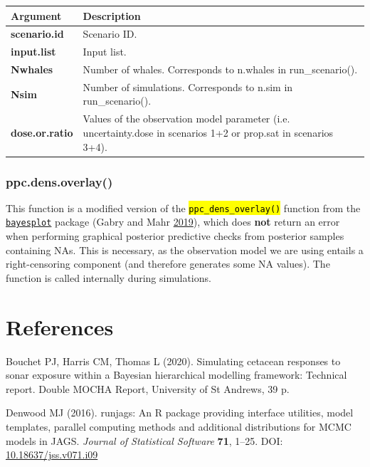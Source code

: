 \documentclass[
]{article}
\begin{document}
\renewcommand{\arraystretch}{1.4}
\begin{table}[H]
\centering
\begin{tabular}{>{\bfseries}l|>{\raggedright\arraybackslash}p{30em}}
\toprule
\textbf{Argument} & \textbf{Description}\\
\midrule
scenario.id & Scenario ID.\\
input.list & Input list.\\
Nwhales & Number of whales. Corresponds to n.whales in run\_scenario().\\
Nsim & Number of simulations. Corresponds to n.sim in run\_scenario().\\
dose.or.ratio & Values of the observation model parameter (i.e. uncertainty.dose in scenarios 1+2 or prop.sat in scenarios 3+4).\\
\bottomrule
\end{tabular}
\end{table}

\subsubsection{ppc.dens.overlay()}

This function is a modified version of the \textcolor{codecolor}{\texttt{\hl{ppc\_dens\_overlay()}}} function from the \href{https://cran.r-project.org/web/packages/bayesplot/index.html}{\texttt{bayesplot}} package (Gabry and Mahr \protect\hyperlink{ref-Gabry2019}{2019}), which does \textbf{not} return an error when performing graphical posterior predictive checks from posterior samples containing NAs. This is necessary, as the observation model we are using entails a right-censoring component (and therefore generates some NA values). The function is called internally during simulations.

\newpage
\section{References}

\hypertarget{refs}{}
\leavevmode\hypertarget{ref-Bouchet2020a}{}%
Bouchet PJ, Harris CM, Thomas L (2020). Simulating cetacean responses to sonar exposure within a Bayesian hierarchical modelling framework: Technical report. Double MOCHA Report, University of St Andrews, 39 p.

\leavevmode\hypertarget{ref-Denwood2016}{}%
Denwood MJ (2016). runjags: An R package providing interface utilities, model templates, parallel computing methods and additional distributions for MCMC models in JAGS. \emph{Journal of Statistical Software} \textbf{71}, 1--25. DOI: \href{https://doi.org/10.18637/jss.v071.i09}{10.18637/jss.v071.i09}
\end{document}
